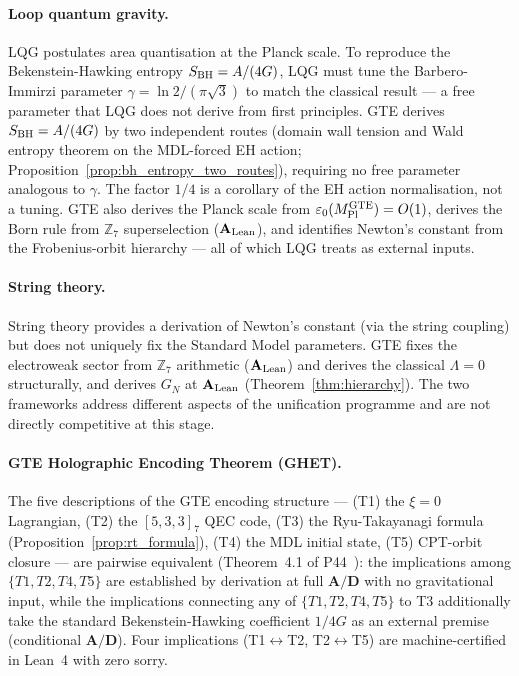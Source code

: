 \documentclass[11pt]{article}
\theoremstyle{remark}
\newcommand{\GTE}{\text{GTE}}
\newcommand{\ZS}{\mathbb{Z}_7}
\newcommand{\epsz}{\varepsilon_0}
\newcommand{\MPltot}{M_{\rm Pl}^{\GTE}}
\newcommand{\CatAL}{\ensuremath{\textbf{A}_{\rm Lean}}}
\newcommand{\CatAD}{\textbf{A/D}}
\begin{document}
\paragraph{Loop quantum gravity.}
LQG postulates area quantisation at the Planck scale.  To reproduce the
Bekenstein-Hawking entropy $S_{\rm BH}=A/(4G)$, LQG must tune the
Barbero-Immirzi parameter $\gamma = \ln2/(\pi\sqrt{3})$ to match the classical
result --- a free parameter that LQG does not derive from first principles.
GTE derives $S_{\rm BH}=A/(4G)$ by two independent routes (domain wall tension
and Wald entropy theorem on the MDL-forced EH action;
Proposition~\ref{prop:bh_entropy_two_routes}), requiring no free parameter
analogous to $\gamma$.  The factor $1/4$ is a corollary of the EH action
normalisation, not a tuning.  GTE also derives the Planck scale from
$\epsz(\MPltot) = O(1)$, derives the Born rule from $\ZS$ superselection
($\CatAL$), and identifies Newton's constant from the Frobenius-orbit hierarchy
--- all of which LQG treats as external inputs.

\paragraph{String theory.}
String theory provides a derivation of Newton's constant (via the string
coupling) but does not uniquely fix the Standard Model parameters.  GTE
fixes the electroweak sector from $\ZS$ arithmetic ($\CatAL$) and derives
the classical $\Lambda=0$ structurally, and derives $G_N$ at $\CatAL$
(Theorem~\ref{thm:hierarchy}).  The two frameworks address different aspects
of the unification programme and are not directly competitive at this stage.

\paragraph{GTE Holographic Encoding Theorem (GHET).}
The five descriptions of the GTE encoding structure --- (T1) the $\xi=0$
Lagrangian, (T2) the $[5,3,3]_7$ QEC code, (T3) the Ryu-Takayanagi formula
(Proposition~\ref{prop:rt_formula}), (T4) the MDL initial state, (T5) CPT-orbit
closure --- are pairwise equivalent (Theorem~4.1 of P44~\cite{SpivackQGR}): the
implications among $\{T1,T2,T4,T5\}$ are established by derivation at full
$\CatAD$ with no gravitational input, while the implications connecting any of
$\{T1,T2,T4,T5\}$ to T3 additionally take the standard Bekenstein-Hawking
coefficient $1/4G$ as an external premise (conditional $\CatAD$).  Four
implications (T1$\leftrightarrow$T2, T2$\leftrightarrow$T5) are machine-certified
in Lean~4 with zero sorry.
\end{document}
